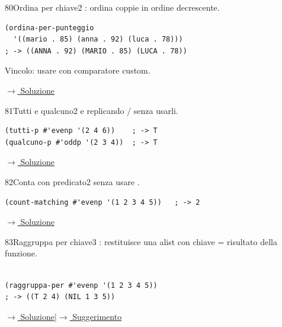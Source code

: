 \label{ex:80}
\begin{colbox}{80}{Ordina per chiave}{2}
 : ordina coppie
 in ordine decrescente.
\begin{lstlisting}
(ordina-per-punteggio
  '((mario . 85) (anna . 92) (luca . 78)))
; -> ((ANNA . 92) (MARIO . 85) (LUCA . 78))
\end{lstlisting}
Vincolo: usare  con comparatore custom.


\small\color{black!55}\hyperref[sol:80]{$\rightarrow$ Soluzione}\normalsize\color{black}
\end{colbox}

\label{ex:81}
\begin{colbox}{81}{Tutti e qualcuno}{2}
  e 
replicando / senza usarli.
\begin{lstlisting}
(tutti-p #'evenp '(2 4 6))    ; -> T
(qualcuno-p #'oddp '(2 3 4))  ; -> T
\end{lstlisting}


\small\color{black!55}\hyperref[sol:81]{$\rightarrow$ Soluzione}\normalsize\color{black}
\end{colbox}

\label{ex:82}
\begin{colbox}{82}{Conta con predicato}{2}
  senza usare .
\nopagebreak
\begin{lstlisting}
(count-matching #'evenp '(1 2 3 4 5))   ; -> 2
\end{lstlisting}


\small\color{black!55}\hyperref[sol:82]{$\rightarrow$ Soluzione}\normalsize\color{black}
\end{colbox}

\label{ex:83}
\begin{colbox}{83}{Raggruppa per chiave}{3}
 : restituisce
una alist con chiave = risultato della funzione.\\\\
\begin{lstlisting}
(raggruppa-per #'evenp '(1 2 3 4 5))
; -> ((T 2 4) (NIL 1 3 5))
\end{lstlisting}

\small\color{black!55}\hyperref[sol:83]{$\rightarrow$ Soluzione}\enspace\textcolor{black!30}{|}\enspace\hyperref[hint:83]{$\rightarrow$ Suggerimento}\normalsize\color{black}
\end{colbox}

